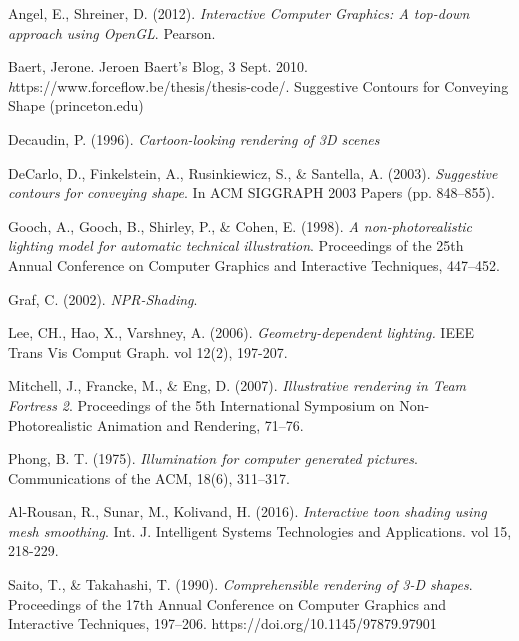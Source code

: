 \begin{thebibliography}{9}

Angel, E., Shreiner, D. (2012). \emph{Interactive Computer Graphics: A top-down approach using OpenGL}. Pearson.

Baert, Jerone. Jeroen Baert's Blog, 3 Sept. 2010. \emph https://www.forceflow.be/thesis/thesis-code/. Suggestive Contours for Conveying Shape (princeton.edu)

Decaudin, P. (1996). \emph{Cartoon-looking rendering of 3D scenes}

DeCarlo, D., Finkelstein, A., Rusinkiewicz, S., \& Santella, A. (2003). \emph{Suggestive contours for conveying shape}. In ACM SIGGRAPH 2003 Papers (pp. 848–855).

Gooch, A., Gooch, B., Shirley, P., \& Cohen, E. (1998). \emph{A non-photorealistic lighting model for automatic technical illustration}. Proceedings of the 25th Annual Conference on Computer Graphics and Interactive Techniques, 447–452.

Graf, C. (2002). \emph{NPR-Shading}.

Lee, CH., Hao, X., Varshney, A. (2006). \emph{Geometry-dependent lighting.} IEEE Trans Vis Comput Graph. vol 12(2), 197-207. 

Mitchell, J., Francke, M., \& Eng, D. (2007). \emph{Illustrative rendering in Team Fortress 2}. Proceedings of the 5th International Symposium on Non-Photorealistic Animation and Rendering, 71–76.

Phong, B. T. (1975). \emph{Illumination for computer generated pictures}. Communications of the ACM, 18(6), 311–317.

Al-Rousan, R., Sunar, M., Kolivand, H. (2016).  \emph{Interactive toon shading using mesh smoothing}. Int. J. Intelligent Systems Technologies and Applications. vol 15, 218-229.

Saito, T., \& Takahashi, T. (1990). \emph{Comprehensible rendering of 3-D shapes}. Proceedings of the 17th Annual Conference on Computer Graphics and Interactive Techniques, 197–206. https://doi.org/10.1145/97879.97901
\end{thebibliography}
